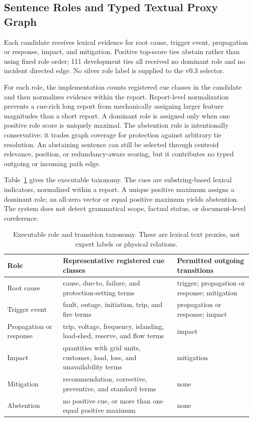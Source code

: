 \documentclass[applsci,article,submit,moreauthors]{Definitions/mdpi}
\begin{document}
\subsection{Sentence Roles and Typed Textual Proxy Graph}

Each candidate receives lexical evidence for root cause, trigger event, propagation or response, impact, and mitigation. Positive top-score ties abstain rather than using fixed role order; 111 development ties all received no dominant role and no incident directed edge. No silver role label is supplied to the v0.3 selector.

For each role, the implementation counts registered cue classes in the candidate and then normalizes evidence within the report. Report-level normalization prevents a cue-rich long report from mechanically assigning larger feature magnitudes than a short report. A dominant role is assigned only when one positive role score is uniquely maximal. The abstention rule is intentionally conservative: it trades graph coverage for protection against arbitrary tie resolution. An abstaining sentence can still be selected through centroid relevance, position, or redundancy-aware scoring, but it contributes no typed outgoing or incoming path edge.

Table~\ref{tab:taxonomy} gives the executable taxonomy. The cues are substring-based lexical indicators, normalized within a report. A unique positive maximum assigns a dominant role; an all-zero vector or equal positive maximum yields abstention. The system does not detect grammatical scope, factual status, or document-level coreference.

\begin{table}[H]
\caption{Executable role and transition taxonomy. These are lexical text proxies, not expert labels or physical relations.}
\label{tab:taxonomy}\centering\small
\begin{tabularx}{\textwidth}{p{2.2cm}XX}
\toprule
Role & Representative registered cue classes & Permitted outgoing transitions\\
\midrule
Root cause & cause, due-to, failure, and protection-setting terms & trigger; propagation or response; mitigation\\
Trigger event & fault, outage, initiation, trip, and fire terms & propagation or response; impact\\
Propagation or response & trip, voltage, frequency, islanding, load-shed, reserve, and flow terms & impact\\
Impact & quantities with grid units, customer, load, loss, and unavailability terms & mitigation\\
Mitigation & recommendation, corrective, preventive, and standard terms & none\\
Abstention & no positive cue, or more than one equal positive maximum & none\\
\bottomrule
\end{tabularx}
\end{table}
\end{document}
